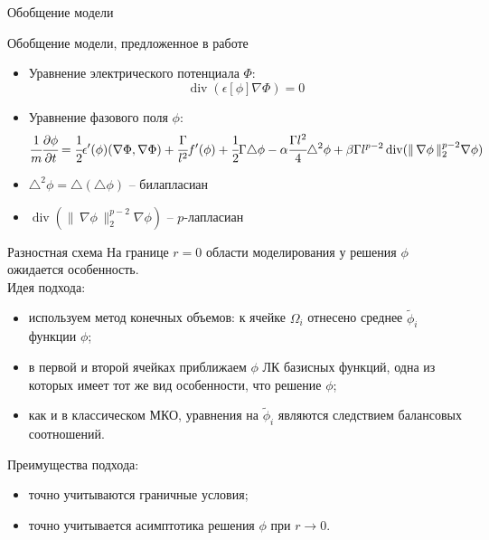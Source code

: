 \documentclass[aspectratio=169]{beamer}
\DeclareMathOperator{\Div}{div}
\begin{document}
\begin{frame}{Обобщение модели}
\begin{block}{Обобщение модели, предложенное в работе \cite{zipunova_higher_codimension}}
\begin{itemize}
	\item Уравнение электрического потенциала $\Phi$:
	$$\Div(\epsilon[\phi] \nabla \Phi) = 0$$
	\item Уравнение фазового поля $\phi$:
	$$\cfrac{1}{m} \cfrac{\partial \phi}{\partial t} =
    \cfrac{1}{2} \epsilon'(\phi) (\nabla \Phi, \nabla \Phi) +
    \cfrac{\Gamma}{l^2} f'(\phi) +
    \cfrac{1}{2} \Gamma \triangle \phi -
    \alpha \cfrac{\Gamma l^2}{4} \triangle^2 \phi +
    \beta \Gamma l^{p - 2} \Div (\| \, \nabla \phi \, \|_2^{p - 2} \nabla \phi)$$
\end{itemize}
\end{block}
\begin{itemize}
	\item $\triangle^2 \phi = \triangle(\triangle \phi)$ -- билапласиан
	\item $\Div (\| \, \nabla \phi \, \|_2^{p - 2} \nabla \phi)$ -- $p$-лапласиан
\end{itemize}
\end{frame}


\begin{frame}{Разностная схема}
На границе $r = 0$ области моделирования у решения $\phi$ ожидается особенность. \\
Идея подхода:
\begin{itemize}
	\item используем метод конечных объемов: к ячейке $\Omega_i$ отнесено среднее
	$\widetilde{\phi}_i$ функции $\phi$;
	\item в первой и второй ячейках приближаем $\phi$ ЛК базисных функций, одна из которых имеет
	тот же вид особенности, что решение $\phi$;
	\item как и в классическом МКО, уравнения на $\widetilde{\phi}_i$ являются следствием
	балансовых соотношений.
\end{itemize}
Преимущества подхода:
\begin{itemize}
	\item точно учитываются граничные условия;
	\item точно учитывается асимптотика решения $\phi$ при $r \to 0$.
\end{itemize}
\end{frame}
\end{document}
